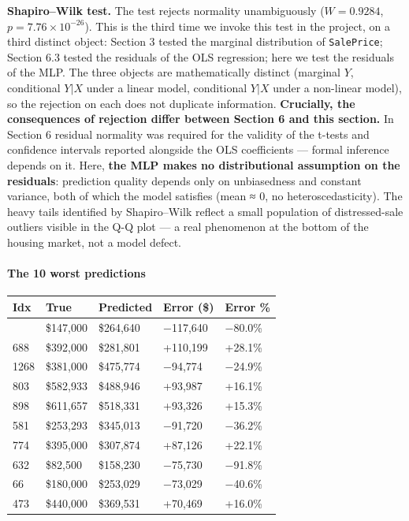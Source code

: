 \textbf{Shapiro--Wilk test.} The test rejects normality unambiguously
(\(W = 0.9284\), \(p = 7.76 \times 10^{-26}\)). This is the third time
we invoke this test in the project, on a third distinct object: Section
3 tested the marginal distribution of \texttt{SalePrice}; Section 6.3
tested the residuals of the OLS regression; here we test the residuals
of the MLP. The three objects are mathematically distinct (marginal
\(Y\), conditional \(Y | X\) under a linear model, conditional \(Y | X\)
under a non-linear model), so the rejection on each does not duplicate
information. \textbf{Crucially, the consequences of rejection differ
between Section 6 and this section.} In Section 6 residual normality was
required for the validity of the t-tests and confidence intervals
reported alongside the OLS coefficients --- formal inference depends on
it. Here, \textbf{the MLP makes no distributional assumption on the
residuals}: prediction quality depends only on unbiasedness and constant
variance, both of which the model satisfies (mean ≈ 0, no
heteroscedasticity). The heavy tails identified by Shapiro--Wilk reflect
a small population of distressed-sale outliers visible in the Q-Q plot
--- a real phenomenon at the bottom of the housing market, not a model
defect.

\paragraph{The 10 worst predictions}\label{the-10-worst-predictions}

\begin{longtable}[]{@{}lllll@{}}
\toprule\noalign{}
Idx & True & Predicted & Error (\$) & Error \% \\
\midrule\noalign{}
\endhead
\bottomrule\noalign{}
\endlastfoot
1324 & \$147,000 & \$264,640 & −117,640 & −80.0\% \\
688 & \$392,000 & \$281,801 & +110,199 & +28.1\% \\
1268 & \$381,000 & \$475,774 & −94,774 & −24.9\% \\
803 & \$582,933 & \$488,946 & +93,987 & +16.1\% \\
898 & \$611,657 & \$518,331 & +93,326 & +15.3\% \\
581 & \$253,293 & \$345,013 & −91,720 & −36.2\% \\
774 & \$395,000 & \$307,874 & +87,126 & +22.1\% \\
632 & \$82,500 & \$158,230 & −75,730 & −91.8\% \\
66 & \$180,000 & \$253,029 & −73,029 & −40.6\% \\
473 & \$440,000 & \$369,531 & +70,469 & +16.0\% \\
\end{longtable}

